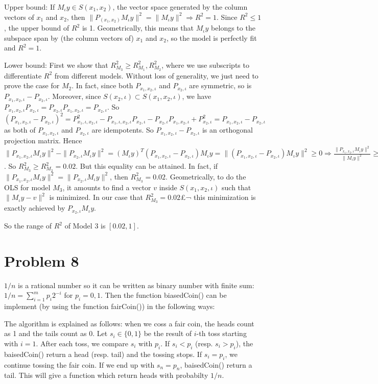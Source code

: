 \documentclass[12pt]{amsart}
\begin{document}
 
 Upper bound: If $M_{\iota}y\in S(x_1,x_2)$, the vector space generated by the column vectors of $x_1$ and $x_2$, then $\|P_{(x_1,x_2)}M_{\iota}y\|^2=\|M_{\iota}y\|^2\Rightarrow R^2=1$. Since $R^2\leq 1$, the upper bound of $R^2$ is 1. Geometrically, this means that $M_{\iota}y$ belongs to the subspace span by (the column vectors of) $x_1$ and $x_2$, so the model is perfectly fit and $R^2=1$.
 
Lower bound: First we show that $R_{M_3}^2\geq R_{M_1}^2,R_{M_2}^2$, where we use subscripts to differentiate $R^2$ from different models. Without loss of generality, we just need to prove the case for $M_2$. In fact, since both $P_{x_1,x_2,\iota}$ and $P_{x_2,\iota}$ are symmetric, so is $P_{x_1,x_2,\iota}-P_{x_2,\iota}$. Moreover, since $S(x_2,\iota)\subset S(x_1,x_2,\iota)$, we have $P_{x_1,x_2,\iota}P_{x_2,\iota}=P_{x_2,\iota}P_{x_1,x_2,\iota}=P_{x_2,\iota}$. So $(P_{x_1,x_2,\iota}-P_{x_2,\iota})^2=
 P_{x_1,\iota,x_2,\iota}^2-P_{x_1,\iota,x_2,\iota}P_{x_2,\iota}
 -P_{x_2,\iota}P_{x_1,x_2,\iota}+P_{x_2,\iota}^2=P_{x_1,x_2,\iota}-P_{x_2,\iota}$
 as both of $P_{x_1,x_2,\iota}$ and $P_{x_2,\iota}$ are idempotents. So $P_{x_1,x_2,\iota}-P_{x_2,\iota}$ is an orthogonal projection matrix. 
  Hence   $\|P_{x_1,x_2,\iota}M_{\iota}y\|^2-
  \|P_{x_2,\iota}M_{\iota}y\|^2=(M_{\iota}y)^T(P_{x_1,x_2,\iota}
 -P_{x_2,\iota})M_{\iota}y=\|(P_{x_1,x_2,\iota}
 -P_{x_2,\iota})M_{\iota}y\|^2\geq0\Rightarrow \frac{\|P_{x_1,x_2,\iota}M_{\iota}y\|^2}{\|M_{\iota}y\|^2}\geq \frac{\|P_{x_2,\iota}M_{\iota}y\|^2}{\|M_{\iota}y\|^2}$. So $R_{M_3}^2\geq R_{M_2}^2=0.02$. But this equality can be attained. In fact, if 
$\|P_{x_1,x_2,\iota}M_{\iota}y\|^2=\|P_{x_2,\iota}M_{\iota}y\|^2$, then 
$R_{M_3}^2=0.02$. Geometrically, to do the OLS for model $M_3$, it amounts to find a
vector $v$ inside $S(x_1,x_2,\iota)$ such that $\|M_{\iota}y-v\|^2$ is minimized. In our case that $R_{M_3}^2=0.02$£¬ this minimization is exactly achieved by $P_{x_2,\iota}M_{\iota}y$.

So the range of $R^2$ of Model 3 is $[0.02, 1]$.


\section{Problem 8}
$1/n$ is a rational number so it can be written as binary number with finite sum: $1/n=\sum_{i=1}^mp_i2^{-i}$ for $p_i=0,1$. Then the function biasedCoin() can be implement (by using the function fairCoin()) in the following ways:


\begin{framed}

\end{framed}
The algorithm is explained as follows: when we coss a fair coin, the heads count as 1 and the tails count as 0. Let $s_i\in\{0,1\}$ be the result of $i$-th toss starting with $i=1$. After each toss, we compare $s_i$ with $p_i$. If $s_i < p_i$ (resp. $s_i > p_i$), the baisedCoin() return a head (resp. tail) and the tossing stops. If $s_i=p_i$, we continue tossing the fair coin. If we end up with $s_n=p_n$, baisedCoin() return a tail. This will give a function which return heads with probabilty $1/n$.
\end{document}
